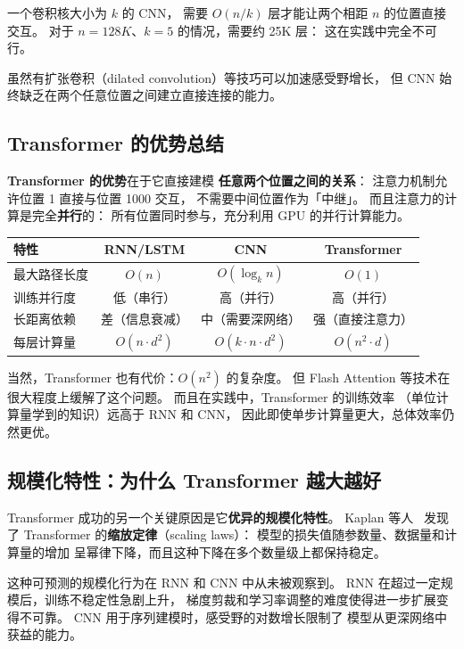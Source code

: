 一个卷积核大小为 $k$ 的 CNN，
需要 $O(n/k)$ 层才能让两个相距 $n$ 的位置直接交互。
对于 $n = 128K$、$k = 5$ 的情况，需要约 25K 层：
这在实践中完全不可行。

虽然有扩张卷积（dilated convolution）等技巧可以加速感受野增长，
但 CNN 始终缺乏在两个任意位置之间建立直接连接的能力。

\subsection{Transformer 的优势总结}

\textbf{Transformer 的优势}在于它直接建模
\textbf{任意两个位置之间的关系}：
注意力机制允许位置 1 直接与位置 1000 交互，
不需要中间位置作为「中继」。
而且注意力的计算是完全\textbf{并行}的：
所有位置同时参与，充分利用 GPU 的并行计算能力。

\begin{center}\small
\renewcommand{\arraystretch}{1.3}
\begin{tabular}{lccc}
\toprule
\rowcolor{figLightGray}
\textbf{特性} & \textbf{RNN/LSTM} & \textbf{CNN} & \textbf{Transformer} \\
\midrule
最大路径长度 & $O(n)$ & $O(\log_k n)$ & $O(1)$ \\
训练并行度 & 低（串行） & 高（并行） & 高（并行） \\
长距离依赖 & 差（信息衰减） & 中（需要深网络） & 强（直接注意力） \\
每层计算量 & $O(n \cdot d^2)$ & $O(k \cdot n \cdot d^2)$ & $O(n^2 \cdot d)$ \\
\bottomrule
\end{tabular}
\end{center}

当然，Transformer 也有代价：$O(n^2)$ 的复杂度。
但 Flash Attention 等技术在很大程度上缓解了这个问题。
而且在实践中，Transformer 的训练效率
（单位计算量学到的知识）远高于 RNN 和 CNN，
因此即使单步计算量更大，总体效率仍然更优。

\subsection{规模化特性：为什么 Transformer 越大越好}

Transformer 成功的另一个关键原因是它\textbf{优异的规模化特性}。
Kaplan 等人~\cite{kaplan2020scaling} 发现了
Transformer 的\textbf{缩放定律}（scaling laws）：
模型的损失值随参数量、数据量和计算量的增加
呈幂律下降，而且这种下降在多个数量级上都保持稳定。

这种可预测的规模化行为在 RNN 和 CNN 中从未被观察到。
RNN 在超过一定规模后，训练不稳定性急剧上升，
梯度剪裁和学习率调整的难度使得进一步扩展变得不可靠。
CNN 用于序列建模时，感受野的对数增长限制了
模型从更深网络中获益的能力。


